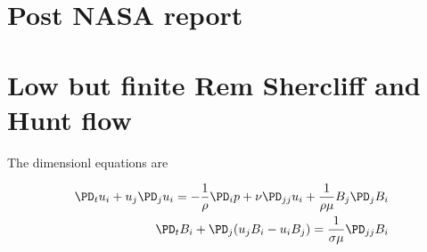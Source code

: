 \documentclass[11pt]{article}
\begin{document}
\doublespacing
\MOONSTITLE
\maketitle

\section{Post NASA report}

\section{Low but finite Rem Shercliff and Hunt flow}
The dimensionl equations are

\begin{equation}\begin{aligned}
\PD_t u_i + u_j \PD_j u_i = - \frac{1}{\rho} \PD_i p + \nu \PD_{jj} u_i + \frac{1}{\rho \mu} B_j \PD_j B_i \\
\PD_t B_i + \PD_j (u_j B_i - u_i B_j) = \frac{1}{\sigma \mu} \PD_{jj} B_i
\end{aligned} \end{equation}
\end{document}
